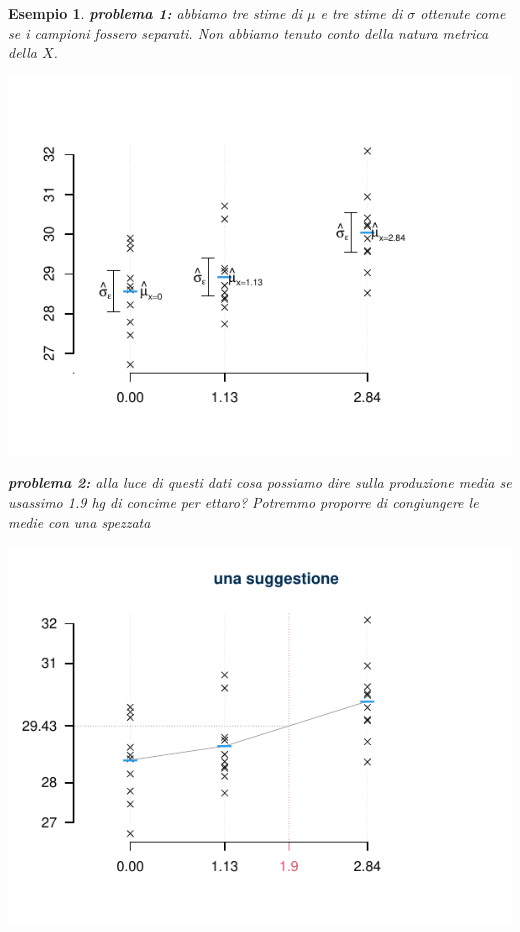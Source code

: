 \documentclass[
  11pt,
]{book}
\theoremstyle{mytheoremstyle}
\theoremstyle{mydefstyle}
\newtheorem{example}{{Esempio}}[section]
\begin{document}
\begin{example}
\textbf{problema 1:} abbiamo tre stime di \(\mu\) e tre stime di \(\sigma\) ottenute come se i campioni fossero separati.
Non abbiamo tenuto conto della natura metrica della \(X\).

\begin{center}\includegraphics{Appunti_di_Statistica_2025_files/figure-latex/17-regressione-I-13-1} \end{center}

\textbf{problema 2:} alla luce di questi dati cosa possiamo dire sulla produzione media se usassimo 1.9 hg di concime per ettaro?
Potremmo proporre di congiungere le medie con una spezzata

\begin{center}\includegraphics{Appunti_di_Statistica_2025_files/figure-latex/17-regressione-I-14-1} \end{center}


\end{example}
\end{document}
